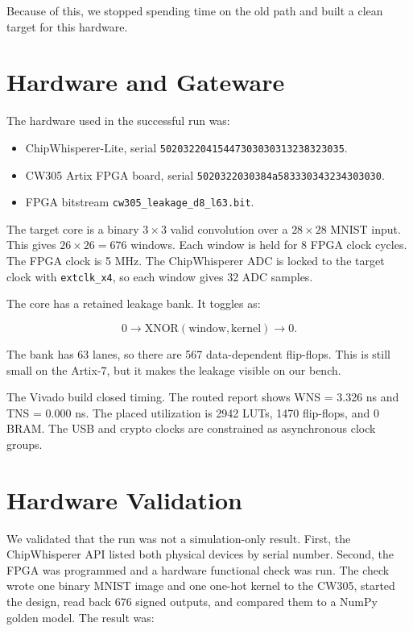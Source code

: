 \documentclass[10pt,conference]{IEEEtran}
\begin{document}
Because of this, we stopped spending time on the old path and built a clean
target for this hardware.

\section{Hardware and Gateware}

The hardware used in the successful run was:

\begin{itemize}
  \item ChipWhisperer-Lite, serial
  \texttt{50203220415447303030313238323035}.
  \item CW305 Artix FPGA board, serial
  \texttt{5020322030384a583330343234303030}.
  \item FPGA bitstream
  \texttt{cw305\_leakage\_d8\_l63.bit}.
\end{itemize}

The target core is a binary $3\times3$ valid convolution over a $28\times28$
MNIST input. This gives $26\times26=676$ windows. Each window is held for 8 FPGA
clock cycles. The FPGA clock is 5 MHz. The ChipWhisperer ADC is locked to the
target clock with \texttt{extclk\_x4}, so each window gives 32 ADC samples.

The core has a retained leakage bank. It toggles as:

\[
0 \rightarrow \mathrm{XNOR}(\mathrm{window}, \mathrm{kernel}) \rightarrow 0 .
\]

The bank has 63 lanes, so there are 567 data-dependent flip-flops. This is still
small on the Artix-7, but it makes the leakage visible on our bench.

The Vivado build closed timing. The routed report shows WNS = 3.326 ns and TNS =
0.000 ns. The placed utilization is 2942 LUTs, 1470 flip-flops, and 0 BRAM. The
USB and crypto clocks are constrained as asynchronous clock groups.

\section{Hardware Validation}

We validated that the run was not a simulation-only result. First, the
ChipWhisperer API listed both physical devices by serial number. Second, the
FPGA was programmed and a hardware functional check was run. The check wrote one
binary MNIST image and one one-hot kernel to the CW305, started the design, read
back 676 signed outputs, and compared them to a NumPy golden model. The result
was:
\end{document}
